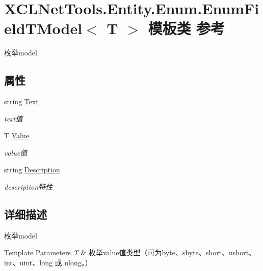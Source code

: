 \hypertarget{class_x_c_l_net_tools_1_1_entity_1_1_enum_1_1_enum_field_t_model}{}\section{X\+C\+L\+Net\+Tools.\+Entity.\+Enum.\+Enum\+Field\+T\+Model$<$ T $>$ 模板类 参考}
\label{class_x_c_l_net_tools_1_1_entity_1_1_enum_1_1_enum_field_t_model}


枚举model  


\subsection*{属性}
\begin{DoxyCompactItemize}
\item 
string \hyperlink{class_x_c_l_net_tools_1_1_entity_1_1_enum_1_1_enum_field_t_model_a19570f5fcd9bb314ca1e7e8f3b8f44b1}{Text}
\begin{DoxyCompactList}\small\item\em text值 \end{DoxyCompactList}\item 
T \hyperlink{class_x_c_l_net_tools_1_1_entity_1_1_enum_1_1_enum_field_t_model_a0b6e9efa5eb3b809fdc2bbb675a4e8e3}{Value}
\begin{DoxyCompactList}\small\item\em value值 \end{DoxyCompactList}\item 
string \hyperlink{class_x_c_l_net_tools_1_1_entity_1_1_enum_1_1_enum_field_t_model_a6702736fc7d4f0f7cfefb74722f9c2ba}{Description}
\begin{DoxyCompactList}\small\item\em description特性 \end{DoxyCompactList}\end{DoxyCompactItemize}


\subsection{详细描述}
枚举model 


\begin{DoxyTemplParams}{Template Parameters}
{\em T} & 枚举value值类型（可为byte、sbyte、short、ushort、int、uint、long 或 ulong。）\\
\hline
\end{DoxyTemplParams}


